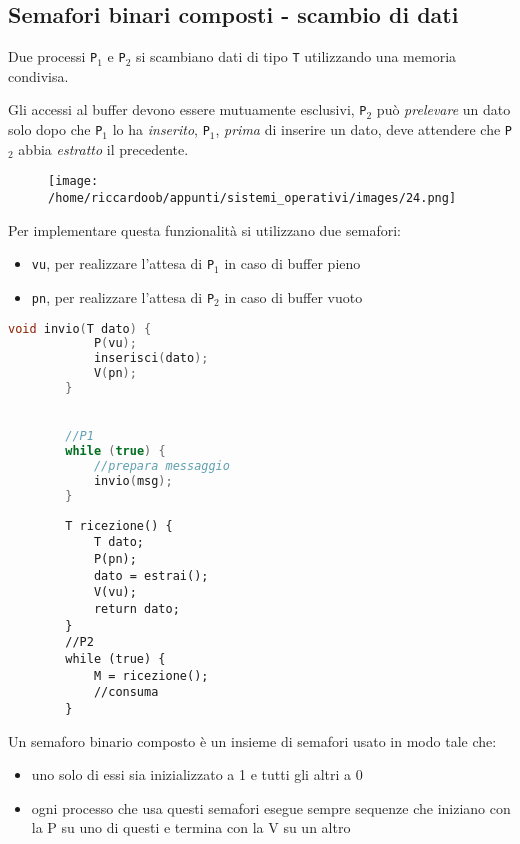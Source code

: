 \subsection{Semafori binari composti - scambio di dati}
Due processi \texttt{P}$_1$ e \texttt{P}$_2$ si scambiano dati di tipo \texttt{T} utilizzando una memoria condivisa.

Gli accessi al buffer devono essere mutuamente esclusivi, \texttt{P}$_2$ può \textit{prelevare} un dato solo dopo che \texttt{P}$_1$ lo ha \textit{inserito}, \texttt{P}$_1$, \textit{prima} di inserire un dato, deve attendere che \texttt{P}$_2$ abbia \textit{estratto} il precedente.

\begin{figure}[H]
    \centering
    \texttt{[image: /home/riccardoob/appunti/sistemi\_operativi/images/24.png]}
\end{figure}

Per implementare questa funzionalità si utilizzano due semafori:
\begin{itemize}
    \item \texttt{vu}, per realizzare l'attesa di \texttt{P}$_1$ in caso di buffer pieno
    \item \texttt{pn}, per realizzare l'attesa di \texttt{P}$_2$ in caso di buffer vuoto
\end{itemize}

\begin{multicols}{2}
    \begin{lstlisting}[language=c]
        void invio(T dato) {
            P(vu);
            inserisci(dato);
            V(pn);
        }


        //P1
        while (true) {
            //prepara messaggio
            invio(msg);
        }
    \end{lstlisting}
    \columnbreak
    \begin{lstlisting}
        T ricezione() {
            T dato;
            P(pn);
            dato = estrai();
            V(vu);
            return dato;
        }
        //P2
        while (true) {
            M = ricezione();
            //consuma
        }
    \end{lstlisting}
\end{multicols}

\begin{mdframed}[topline=false,bottomline=false,rightline=false]
    Un semaforo binario composto è un insieme di semafori usato in modo tale che:
    \begin{itemize}
        \item uno solo di essi sia inizializzato a 1 e tutti gli altri a 0
        \item ogni processo che usa questi semafori esegue sempre sequenze che iniziano con la P su uno di questi e termina con la V su un altro
    \end{itemize}
\end{mdframed}
